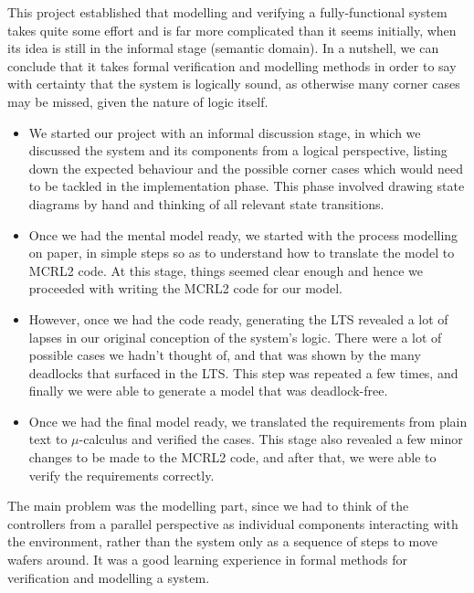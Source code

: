 This project established that modelling and verifying a fully-functional system takes quite some effort and is far more complicated than it seems initially, when its idea is still in the informal stage (semantic domain). In a nutshell, we can conclude that it takes formal verification and modelling methods in order to say with certainty that the system is logically sound, as otherwise many corner cases may be missed, given the nature of logic itself.

\begin{itemize}
\item We started our project with an informal discussion stage, in which we discussed the system and its components from a logical perspective, listing down the expected behaviour and the possible corner cases which would need to be tackled in the implementation phase. This phase involved drawing state diagrams by hand and thinking of all relevant state transitions.
\item Once we had the mental model ready, we started with the process modelling on paper, in simple steps so as to understand how to translate the model to MCRL2 code. At this stage, things seemed clear enough and hence we proceeded with writing the MCRL2 code for our model.
\item However, once we had the code ready, generating the LTS revealed a lot of lapses in our original conception of the system's logic. There were a lot of possible cases we hadn't thought of, and that was shown by the many deadlocks that surfaced in the LTS. This step was repeated a few times, and finally we were able to generate a model that was deadlock-free.
\item Once we had the final model ready, we translated the requirements from plain text to $\mu$-calculus and verified the cases. This stage also revealed a few minor changes to be made to the MCRL2 code, and after that, we were able to verify the requirements correctly.
\end{itemize}

The main problem was the modelling part, since we had to think of the controllers from a parallel perspective as individual components interacting with the environment, rather than the system only as a sequence of steps to move wafers around. It was a good learning experience in formal methods for verification and modelling a system.